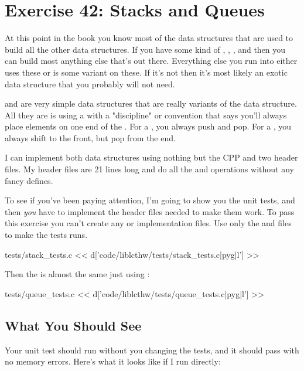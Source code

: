 \chapter{Exercise 42: Stacks and Queues}

At this point in the book you know most of the data structures that are used to
build all the other data structures.  If you have some kind of ,
, , and  then you can build most
anything else that's out there.  Everything else you run into either uses
these or is some variant on these.  If it's not then it's most likely an
exotic data structure that you probably will not need.

 and  are very simple data structures that are
really variants of the  data structure.  All they are is using
a  with a "discipline" or convention that says you'll always 
place elements on one end of the .  For a , you
always push and pop.  For a , you always shift to the 
front, but pop from the end.

I can implement both data structures using nothing but the CPP and two
header files.  My header files are 21 lines long and do all the 
 and  operations without any fancy defines.

To see if you've been paying attention, I'm going to show you the 
unit tests, and then \emph{you} have to implement the header files
needed to make them work.  To pass this exercise you can't create any
 or  implementation files.  Use only the
 and  files to make the tests runs.

\begin{code}{tests/stack\_tests.c}
<< d['code/liblcthw/tests/stack_tests.c|pyg|l'] >>
\end{code}

Then the  is almost the same just using :

\begin{code}{tests/queue\_tests.c}
<< d['code/liblcthw/tests/queue_tests.c|pyg|l'] >>
\end{code}

\section{What You Should See}

Your unit test should run without you changing the tests, and it
should pass  with no memory errors.  Here's
what it looks like if I run  directly:

